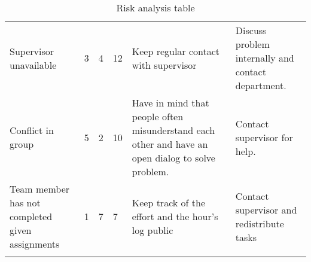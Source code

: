 \begin{longtable}{|p{3.6cm}!{\vrule width -1pt}l!{\vrule width -1pt}l!{\vrule width -1pt}l!{\vrule width -1pt}p{4.4cm}!{\vrule width -1pt}p{4.4cm}|}
Supervisor unavailable & 3 & 4 & 12 & Keep regular contact with supervisor & Discuss problem internally and contact department.\\
Conflict in group & 5 & 2 & 10 & Have in mind that people often misunderstand each other and have an open dialog to solve problem. & Contact supervisor for help.\\
Team member has not completed given assignments & 1 & 7 & 7 & Keep track of the effort and the hour's log public & Contact supervisor and redistribute tasks \\\hline
\caption{Risk analysis table}
\end{longtable}
